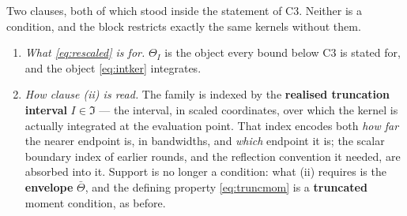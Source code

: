 \begin{remark}\label{rem:app3read}
Two clauses, both of which stood inside the statement of C3. Neither is a condition, and the block
restricts exactly the same kernels without them.
\begin{enumerate}
\item[(1)] \emph{What \eqref{eq:rescaled} is for.} $\Theta_{I}$ is the object every bound below C3 is
stated for, and the object \eqref{eq:intker} integrates.
\item[(2)] \emph{How clause \textup{(ii)} is read.} The family is indexed by the \textbf{realised
truncation interval} $I\in\mathfrak I$ --- the interval, in scaled coordinates, over which the kernel
is actually integrated at the evaluation point. That index encodes both \emph{how far} the nearer
endpoint is, in bandwidths, and \emph{which} endpoint it is; the scalar boundary index of earlier
rounds, and the reflection convention it needed, are absorbed into it. Support is no longer a
condition: what \textup{(ii)} requires is the \textbf{envelope} $\bar\Theta$, and the defining property
\eqref{eq:truncmom} is a \textbf{truncated} moment condition, as before.
\end{enumerate}
\end{remark}

%
%

